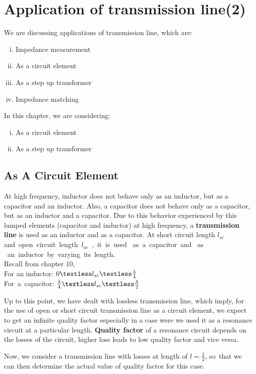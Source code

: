 \chapter{Application of transmission line(2)}
We are discussing applications of transmission line, which are:
\begin{enumerate}[(i)]
\item Impedance measurement
\item As a circuit element
\item As a step up transformer
\item Impedance matching 
\end{enumerate}

In this chapter, we are considering:
\begin{enumerate}[(i)]
\item As a circuit element
\item As a step up transformer
\end{enumerate}

\section{As A Circuit Element}
At high frequency, inductor does not behave only as an inductor, but as a capacitor and an inductor. Also, a capacitor does not behave only as a capacitor, but as an inductor and a capacitor. Due to this behavior experienced by this lumped elements (capacitor and inductor) at high frequency, a \textbf{transmission line} is used as an inductor and as a capacitor.
At short circuit length $l_{sc}$ and\ open\ circuit\ length\ $l_{oc}$\ ,\ it\ is\ used \ as\ a\ capacitor\ and \ as \ an\ inductor\ by\ varying\ its\ length.\\
Recall from chapter 10,\\
For an inductor: $0 \textless l_{sc} \textless 
\frac{\lambda}{\small 4}$\\
For\ a\ capacitor: $\frac{\lambda}{4} \textless l_{sc} \textless \frac{\lambda}{2} $


Up to this point, we have dealt with lossless transmission line, which imply, for the use of open or short circuit transmission line as a circuit element, we expect to get an infinite quality factor especially in a case were we used it as a resonance circuit at a particular length. \textbf{Quality factor} of a resonance circuit depends on the losses of the circuit, higher loss leads to low quality factor and vice versa.

Now, we consider a transmission line with losses at length of $ l=\frac{\lambda}{4} $, so\ that we can then determine the actual value of quality factor for this case.\\

